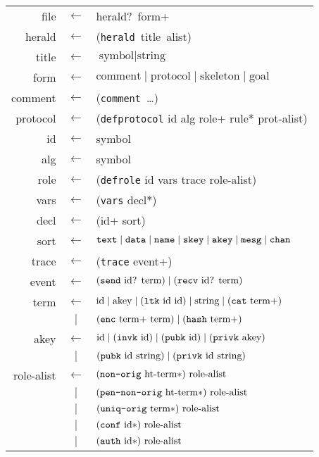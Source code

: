 \begin{table}
\newcommand{\sym}[1]{\textup{\texttt{#1}}}
\begin{center}\scshape
\begin{tabular}{rcl}
file&$\leftarrow$&herald?~form+
\\herald&$\leftarrow$&
(\sym{herald}~title~alist)
\\title&$\leftarrow$&$\mbox{symbol}\mid\mbox{string}$
\\form&$\leftarrow$&
$\mbox{comment}\mid\mbox{protocol}\mid\mbox{skeleton}\mid\mbox{goal}$
\\ comment&$\leftarrow$&
(\sym{comment}~\ldots)
\\ protocol&$\leftarrow$&
(\sym{defprotocol} id alg role+ rule$\ast$ prot-alist)
\\ id&$\leftarrow$&symbol
\\ alg&$\leftarrow$&symbol
\\ role&$\leftarrow$&
(\sym{defrole} id vars trace role-alist)
\\ vars&$\leftarrow$&
(\sym{vars} decl$\ast$)
\\ decl&$\leftarrow$&
(id+ sort)
\\ sort&$\leftarrow$&
$\sym{text} \mid \sym{data} \mid \sym{name} \mid \sym{skey}
\mid \sym{akey}\mid\sym{mesg}\mid\sym{chan}$
\\ trace&$\leftarrow$&(\sym{trace} event+)
\\ event&$\leftarrow$&
$(\sym{send}\mbox{ id? term})\mid(\sym{recv}\mbox{ id? term})$
\\ term&$\leftarrow$&
$\mbox{id}\mid\mbox{akey}\mid(\sym{ltk}\mbox{ id id})\mid\mbox{string}\mid(\sym{cat}\mbox{ term+})$
\\ &$\mid$&$(\sym{enc}\mbox{ term+ term})\mid(\sym{hash}\mbox{ term+})$
\\ akey&$\leftarrow$&
$\mbox{id}\mid(\sym{invk}\mbox{ id})
\mid(\sym{pubk}\mbox{ id})
\mid(\sym{privk}\mbox{ akey})$
\\ &$\mid$&$(\sym{pubk}\mbox{ id}\mbox{ string})
\mid(\sym{privk}\mbox{ id}\mbox{ string})$
\\ role-alist&$\leftarrow$&$
(\sym{non-orig}\mbox{ ht-term}\ast)\mbox{ role-alist}$
\\ &$\mid$&$(\sym{pen-non-orig}\mbox{ ht-term}\ast)\mbox{ role-alist}$
\\ &$\mid$&$(\sym{uniq-orig}\mbox{ term}\ast)\mbox{ role-alist}$
\\ &$\mid$&$(\sym{conf}\mbox{ id}\ast)\mbox{ role-alist}$
\\ &$\mid$&$(\sym{auth}\mbox{ id}\ast)\mbox{ role-alist}$

\end{tabular}
\end{center}
\end{table}
